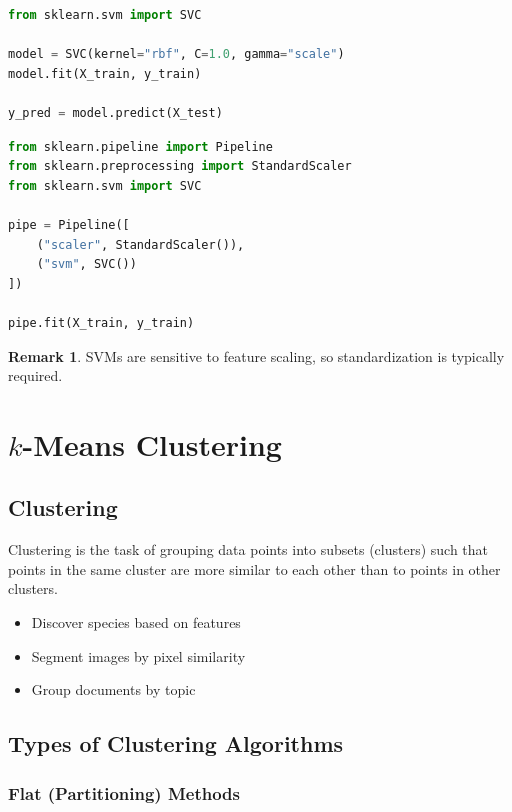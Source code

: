 \documentclass[12pt,oneside]{book}
\numberwithin{equation}{section}
\theoremstyle{definition}
\newtheorem{remark}{Remark}[section]
\theoremstyle{plain}
\theoremstyle{remark}
\begin{document}
\begin{lstlisting}[language=Python]
from sklearn.svm import SVC

model = SVC(kernel="rbf", C=1.0, gamma="scale")
model.fit(X_train, y_train)

y_pred = model.predict(X_test)
\end{lstlisting}

\begin{lstlisting}[language=Python]
from sklearn.pipeline import Pipeline
from sklearn.preprocessing import StandardScaler
from sklearn.svm import SVC

pipe = Pipeline([
    ("scaler", StandardScaler()),
    ("svm", SVC())
])

pipe.fit(X_train, y_train)
\end{lstlisting}

\begin{remark}
SVMs are sensitive to feature scaling, so standardization is typically required.
\end{remark}

\chapter{$k$-Means Clustering}

\section{Clustering}

Clustering is the task of grouping data points into subsets (clusters) such that points in the same cluster are more similar to each other than to points in other clusters.

\begin{itemize}
    \item Discover species based on features
    \item Segment images by pixel similarity
    \item Group documents by topic
\end{itemize}

\section{Types of Clustering Algorithms}

\subsection{Flat (Partitioning) Methods}
\end{document}
